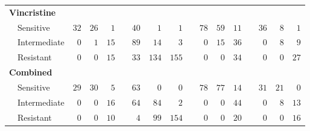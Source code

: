 \documentclass{article}
\begin{document}
\begin{table}[!tbp]
\begin{center}
\begin{tabular}{lrrrcrrrcrrrcrrr}
\hline
{\bfseries Vincristine}&&&&&&&&&&&&&&&\tabularnewline
~~Sensitive&$32$&$26$&$ 1$&&$ 40$&$  1$&$  1$&&$78$&$59$&$11$&&$36$&$ 8$&$ 1$\tabularnewline
~~Intermediate&$ 0$&$ 1$&$15$&&$ 89$&$ 14$&$  3$&&$ 0$&$15$&$36$&&$ 0$&$ 8$&$ 9$\tabularnewline
~~Resistant&$ 0$&$ 0$&$15$&&$ 33$&$134$&$155$&&$ 0$&$ 0$&$34$&&$ 0$&$ 0$&$27$\tabularnewline
\hline
{\bfseries Combined}&&&&&&&&&&&&&&&\tabularnewline
~~Sensitive&$29$&$30$&$ 5$&&$ 63$&$  0$&$  0$&&$78$&$77$&$14$&&$31$&$21$&$ 0$\tabularnewline
~~Intermediate&$ 0$&$ 0$&$16$&&$ 64$&$ 84$&$  2$&&$ 0$&$ 0$&$44$&&$ 0$&$ 8$&$13$\tabularnewline
~~Resistant&$ 0$&$ 0$&$10$&&$  4$&$ 99$&$154$&&$ 0$&$ 0$&$20$&&$ 0$&$ 0$&$16$\tabularnewline
\hline
\end{tabular}
\end{center}
\end{table}
\end{document}
